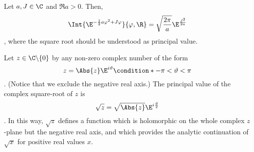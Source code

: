 \begin{theorem}
   Let  $a,J\in\C$ and $\Re a> 0$.
   Then, 
   \begin{dmath}
      \Int{ \E^{ -\frac{1}{2} a \varphi^{2} + J\varphi}}{\varphi, \R} =
      \sqrt{\frac{2\pi}{a}} \E^{\frac{J^{2}}{2a}}
   \end{dmath},
   where the square root should be understood as principal value.
\end{theorem}
   \begin{remark}
      Let  $z\in\C\backslash\lbrace0\rbrace$ by any non-zero complex
      number of the form 
      \begin{dmath*}
	 z=\Abs{z} \E^{i\vartheta} \condition*{-\pi < \vartheta < \pi}
      \end{dmath*}.
      (Notice that we exclude the negative real axis.)
      The principal value of the complex square-root of $z$ is 
      \begin{dmath*}
	 \sqrt{z} = \sqrt{\Abs{z}} \E^{i \frac{\vartheta}{2}}
      \end{dmath*}.
      In this way, $\sqrt{z}$ defines a function which is holomorphic on the
      whole complex $z$-plane but the negative real axis, and which provides
      the analytic continuation of $\sqrt{x}$ for positive real values $x$.
   \end{remark}

